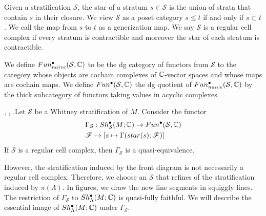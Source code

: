 \begin{definition}
Given a stratification $\mathcal{S}$, the star of a stratum $s\in \mathcal{S}$ is the union of strata that contain $s$ in their closure. We view $\mathcal{S}$ as a poset category $s\leq t$ if and only if $s \subset \overline{t}$. We call the map from $s$ to $t$ as a generization map. We say $\mathcal{S}$ is a regular cell complex if every stratum is contractible and moreover the star of each stratum is contractible.
\end{definition}

\begin{definition}
We define $Fun^\bullet_{naive}(\mathcal{S},\mathbb{C})$ to be the dg category of functors from $\mathcal{S}$ to the category whose objects are cochain complexes of $\mathbb{C}$-vector spaces and whose maps are cochain maps. 
We define $Fun^\bullet(\mathcal{S}, \mathbb{C})$ the dg quotient \cite{drinfeld2004dg} of $Fun^\bullet_{naive}(\mathcal{S},\mathbb{C})$ by the thick subcategory of functors taking values in acyclic complexes.
\end{definition}

\begin{proposition}
\cite{kashiwara1984riemann}, \cite{shepard1985cellular}, \cite[Lemma~2.3.2]{nadler2009microlocal}.Let $\mathcal{S}$ be a Whitney stratification of $M$. Consider the functor 
\begin{align*}
&\Gamma_\mathcal{S} : Sh^\bullet_\mathcal{S}(M;\mathbb{C}) \rightarrow Fun^\bullet(\mathcal{S},\mathbb{C})\\
&\mathscr{F} \mapsto [s\mapsto \Gamma(star(s);\mathscr{F})]
\end{align*}
If $\mathcal{S}$ is a regular cell complex, then $\Gamma_\mathcal{S}$ is a quasi-equivalence.
\end{proposition}
However, the stratification induced by the front diagram is not necessarily a regular cell complex. Therefore, we choose an $\mathcal{S}$ that refines of the stratification induced by $\pi(\Lambda)$. In figures, we draw the new line segments in squiggly lines. \\
The restriction of $\Gamma_\mathcal{S}$ to $Sh^\bullet_\Lambda(M;\mathbb{C})$ is quasi-fully faithful. We will describe the essential image of $Sh^\bullet_\Lambda(M;\mathbb{C})$ under $\Gamma_\mathcal{S}$.

